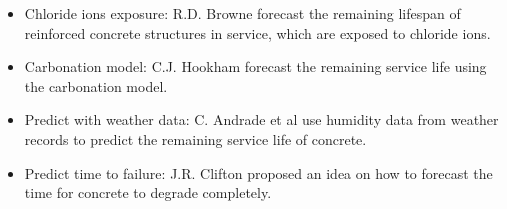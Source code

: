 \documentclass[12pt, titlepage]{article}
\begin{document}
\begin{itemize}
    \item Chloride ions exposure: 
    \label{item:browne}
    R.D. Browne \cite{browne} forecast the remaining lifespan of reinforced concrete structures in service, which are exposed to chloride ions.

    \item Carbonation model:
    \label{item:hookham}
    C.J. Hookham\cite{hookham} forecast the remaining service life using the carbonation model.

    \item Predict with weather data:
    \label{item:weather}
     C. Andrade et al \cite{andrade} use humidity data from weather records to predict the remaining service life of concrete.

    \item Predict time to failure:
    \label{item:failure}
    J.R. Clifton \cite{clifton} proposed an idea on how to forecast the time for concrete to degrade completely.
\end{itemize}
\newpage
\end{document}
